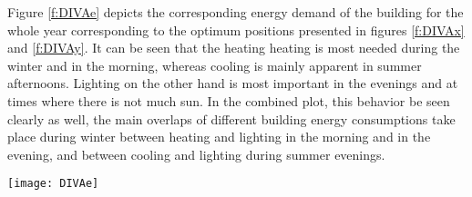 	Figure \ref{f:DIVAe} depicts the corresponding energy demand of the building for the whole year corresponding to the optimum positions presented in figures \ref{f:DIVAx} and \ref{f:DIVAy}. It can be seen that the heating heating is most needed during the winter and in the morning, whereas cooling is mainly apparent in summer afternoons. Lighting on the other hand is most important in the evenings and at times where there is not much sun. In the combined plot, this behavior be seen clearly as well, the main overlaps of different building energy consumptions take place during winter between heating and lighting in the morning and in the evening, and between cooling and lighting during summer evenings. 

	\begin{figure*}
		\begin{center}
		\texttt{[image: DIVAe]}
		\caption{Carpet plots detailing the net energy consumption. Each square represents the total energy consumption for that specific hour of the entire month. Red colours detail the energy demand, while blue colours detail the energy supply.}
		\label{f:DIVAe}
		\end{center}
	\end{figure*}
	

	
	
	
	